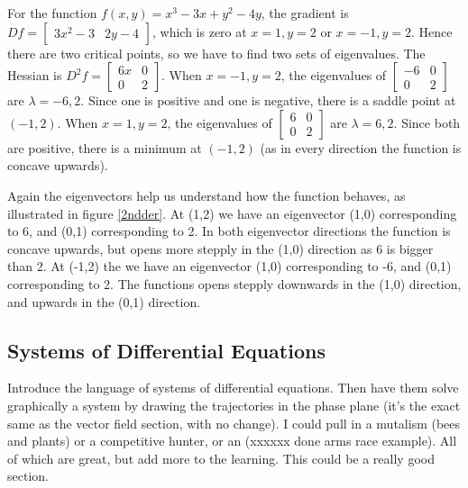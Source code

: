 \begin{example}
For the function {$f(x,y)=x^3-3x+y^2-4y$}, the gradient is $Df = \begin{bmatrix}3x^2-3&2y-4 \end{bmatrix}$, which is zero at $x=1,y=2$ or $x=-1,y=2$. Hence there are two critical points, so we have to find two sets of eigenvalues. The Hessian is $D^2f = \begin{bmatrix}6x&0 \\0&2\end{bmatrix}$. When $x=-1,y=2$, the eigenvalues of $\begin{bmatrix}-6&0 \\0&2\end{bmatrix}$ are $\lambda=-6,2$. Since one is positive and one is negative, there is a saddle point at $(-1,2)$. When $x=1,y=2$, the eigenvalues of $\begin{bmatrix}6&0 \\0&2\end{bmatrix}$ are $\lambda=6,2$. Since both are positive, there is a minimum at $(-1,2)$ (as in every direction the function is concave upwards).

Again the eigenvectors help us understand how the function behaves, as illustrated in figure \ref{2ndder}.  At (1,2) we have an eigenvector (1,0) corresponding to 6, and (0,1) corresponding to 2. In both eigenvector directions the function is concave upwards, but opens more stepply in the (1,0) direction as 6 is bigger than 2.  At (-1,2) the we have an eigenvector (1,0) corresponding to -6, and (0,1) corresponding to 2. The functions opens stepply downwards in the (1,0) direction, and upwards in the (0,1) direction. 
\end{example}








\subsection{Systems of Differential Equations}
Introduce the language of systems of differential equations.  Then have them solve graphically a system by drawing the trajectories in the phase plane (it's the exact same as the vector field section, with no change).  I could pull in a mutalism (bees and plants) or a competitive hunter, or an (xxxxxx done arms race example).  All of which are great, but add more to the learning.  This could be a really good section.  


